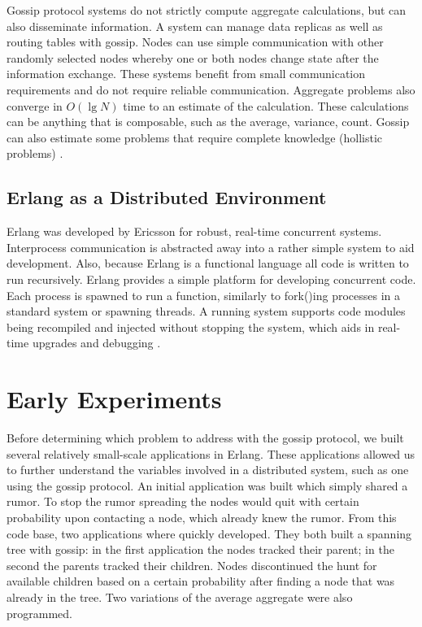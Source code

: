 \documentclass[11pt,twocolumn]{article}
\begin{document}
Gossip protocol systems do not strictly compute aggregate calculations, but can also disseminate information.  A system can manage data replicas as well as routing tables with gossip.  Nodes can use simple communication with other randomly selected nodes whereby one or both nodes change state after the information exchange.  These systems benefit from small communication requirements and do not require reliable communication.  Aggregate problems also converge in $O(\lg N)$ time to an estimate of the calculation.  These calculations can be anything that is composable, such as the average, variance, count.  Gossip can also estimate some problems that require complete knowledge (hollistic problems) \cite{Birm2007}.

\subsection{Erlang as a Distributed Environment}

Erlang was developed by Ericsson for robust, real-time concurrent systems.  Interprocess communication is abstracted away into a rather simple system to aid development.  Also, because Erlang is a functional language all code is written to run recursively.  Erlang provides a simple platform for developing concurrent code.  Each process is spawned to run a function, similarly to fork()ing processes in a standard system or spawning threads.  A running system supports code modules being recompiled and injected without stopping the system, which aids in real-time upgrades and debugging \cite{Erlang}.

\section{Early Experiments}

Before determining which problem to address with the gossip protocol, we built several relatively small-scale applications in Erlang.  These applications allowed us to further understand the variables involved in a distributed system, such as one using the gossip protocol.  An initial application was built which simply shared a rumor.  To stop the rumor spreading the nodes would quit with certain probability upon contacting a node, which already knew the rumor.  From this code base, two applications where quickly developed.  They both built a spanning tree with gossip: in the first application the nodes tracked their parent; in the second the parents tracked their children.  Nodes discontinued the hunt for available children based on a certain probability after finding a node that was already in the tree.  Two variations of the average aggregate were also programmed.
\end{document}
